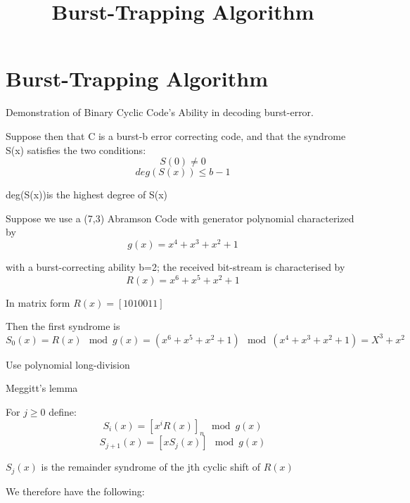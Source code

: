 \documentclass[12pt,a4paper,violet]{bbe}
\begin{document}
	\title{Burst-Trapping Algorithm}
	\section{Burst-Trapping Algorithm}
	
	Demonstration of Binary Cyclic Code's Ability in decoding burst-error. 
	\begin{definition}
	Suppose then that C is a burst-b error correcting code, and that the syndrome S(x) satisfies the two conditions:
	\begin{equation}
	    S(0)\neq 0
	\end{equation}
	\begin{equation}
	    deg(S(x)) \leq b-1
	\end{equation}
	\end{definition}
	\begin{remark}
	deg(S(x))is the highest degree of S(x)
	\end{remark}
	
Suppose we use a (7,3) Abramson Code with generator polynomial characterized by 
\begin{equation}
    g(x) = x^4 + x^3 + x^2 + 1
\end{equation} 

with a burst-correcting ability b=2; the received bit-stream is characterised by 
\begin{equation}
    R(x)=x^6+x^5+x^2+1
\end{equation}
    \begin{remark}
        In matrix form \(R(x)=[1 0 1 0 0 1 1]\)
    \end{remark}
    Then the first syndrome is 
\begin{equation}
    S_0(x)=R(x) \mod g(x) =(x^6+x^5+x^2+1) \mod (x^4 + x^3 + x^2 + 1)=X^3+x^2
\end{equation}
\begin{remark}
    Use polynomial long-division
\end{remark}
\begin{definition}
    Meggitt's lemma 
    
    For \(j\geq 0\) define:
    \begin{equation}
        S_i(x)=[x^iR(x)]_n \mod g(x)
    \end{equation}
    \begin{equation}
        S_{j+1}(x)=[xS_j(x)]\mod g(x)
    \end{equation}
\end{definition}
\begin{remark}
    \(S_j(x)\) is the remainder syndrome of the jth cyclic shift of \(R(x)\)
\end{remark}
We therefore have the following:
\end{document}
